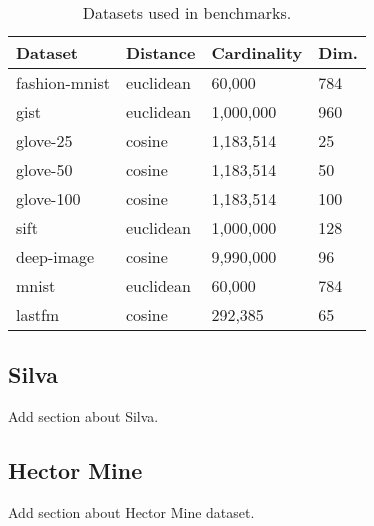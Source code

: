 \begin{table}[!t]
    \caption{Datasets used in benchmarks.}
    \label{table:datasets:summary}
    \vskip 0.15in
    \begin{center}
        \begin{small}
            \begin{sc}
                \begin{tabular}{|l|l|l|l|}
                    \hline
                    \textbf{Dataset} & \textbf{Distance}  &\textbf{Cardinality}  & \textbf{Dim.}  \\
                    \hline
                    fashion-mnist    & euclidean              & 60,000             & 784       \\
                    \hline 
                    gist             & euclidean              & 1,000,000          & 960       \\
                    \hline
                    glove-25         & cosine              & 1,183,514          & 25        \\
                    \hline
                    glove-50         & cosine              & 1,183,514          & 50        \\
                    \hline
                    glove-100        & cosine              & 1,183,514          & 100       \\
                    \hline
                    sift             & euclidean              & 1,000,000          & 128       \\
                    \hline
                    deep-image       & cosine              & 9,990,000          & 96        \\
                    \hline
                    mnist            & euclidean              & 60,000             & 784       \\
                    \hline
                    lastfm           & cosine              & 292,385            & 65        \\
                    \hline
                \end{tabular}
            \end{sc}
        \end{small}
    \end{center}
    \vskip -0.1in
\end{table}


\subsection{Silva}
\label{subsec:silva}

Add section about Silva. 


\subsection{Hector Mine}

Add section about Hector Mine dataset. 
\label{subsec:hector-mine}
